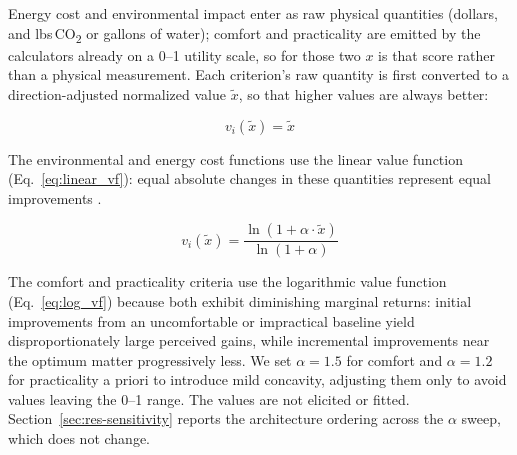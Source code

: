 \documentclass[final,3p,times]{elsarticle}
\begin{document}
Energy cost and environmental impact enter as raw physical quantities (dollars, and lbs\,CO\textsubscript{2} or gallons of water); comfort and practicality are emitted by the calculators already on a 0--1 utility scale, so for those two $x$ is that score rather than a physical measurement. Each criterion's raw quantity is first converted to a direction-adjusted normalized value $\tilde{x}$, so that higher values are always better:

\begin{equation}
\label{eq:linear_vf}
v_i(\tilde{x}) = \tilde{x}
\end{equation}

The environmental and energy cost functions use the linear value function (Eq.~\ref{eq:linear_vf}): equal absolute changes in these quantities represent equal improvements \cite{dyer1979,keeneyraiffa1976}.

\begin{equation}
\label{eq:log_vf}
v_i(\tilde{x}) = \frac{\ln\!\left(1 + \alpha \cdot \tilde{x}\right)}{\ln(1 + \alpha)}
\end{equation}

The comfort and practicality criteria use the logarithmic value function (Eq.~\ref{eq:log_vf}) because both exhibit diminishing marginal returns: initial improvements from an uncomfortable or impractical baseline yield disproportionately large perceived gains, while incremental improvements near the optimum matter progressively less. We set $\alpha = 1.5$ for comfort and $\alpha = 1.2$ for practicality a priori to introduce mild concavity, adjusting them only to avoid values leaving the 0--1 range. The values are not elicited or fitted. Section~\ref{sec:res-sensitivity} reports the architecture ordering across the $\alpha$ sweep, which does not change.


\FloatBarrier
\end{document}
